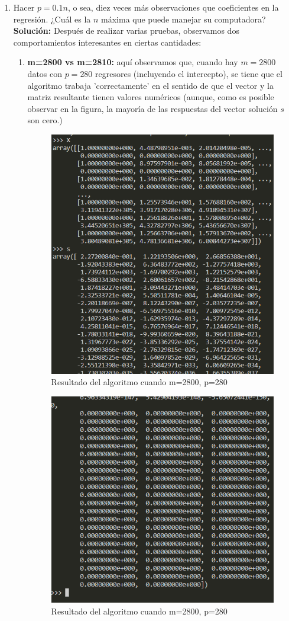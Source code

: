 \documentclass[letterpaper]{article}
\newcommand{\1}{\mathds{1}}
\theoremstyle{definition}
\theoremstyle{definition}
\theoremstyle{definition}
\theoremstyle{definition}
\theoremstyle{definition}
\begin{document}
\begin{enumerate}
  

    \item Hacer $p=0.1n$, o sea, diez veces más observaciones que coeficientes en 
    la regresión. ¿Cuál es la $n$ máxima que puede manejar su computadora?\\

    \textbf{Solución:} Después de realizar varias pruebas, observamos dos comportamientos interesantes
    en ciertas cantidades:
    \begin{enumerate}
        \item \textbf{m=2800 vs m=2810:} aquí observamos que, cuando hay $m=2800$ datos con $p=280$ regresores (incluyendo el intercepto), 
        se tiene que el algoritmo trabaja 'correctamente' en el sentido de que el vector y la matriz resultante tienen valores 
        numéricos (aunque, como es posible observar en la figura, la mayoría de las respuestas del vector solución $s$ son cero.)
        \newline

        \begin{figure}[h]
            \centering
            \includegraphics[width=0.5\linewidth]{m2800.png}
            \caption{Resultado del algoritmo cuando m=2800, p=280}
        \end{figure}

        \begin{figure}[h]
            \centering
            \includegraphics[width=0.5\linewidth]{m28002.png}
            \caption{Resultado del algoritmo cuando m=2800, p=280}
        \end{figure}


\end{enumerate}
\end{enumerate}
\end{document}
